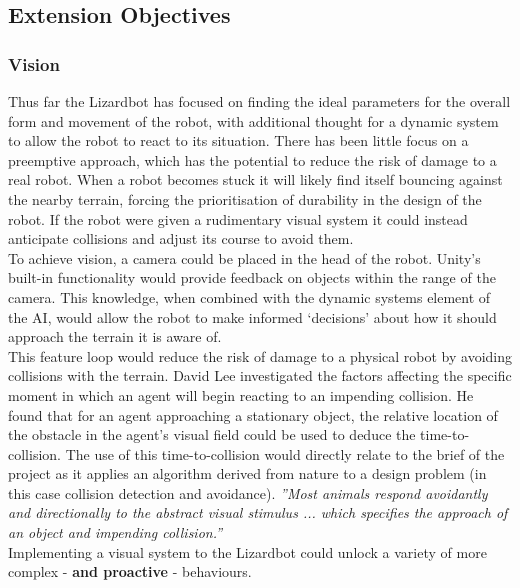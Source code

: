 \documentclass{article}
\begin{document}
\subsection{Extension Objectives}
\label{sec:Extension Objectives}
\subsubsection{Vision}
\label{sec:Vision}
Thus far the Lizardbot has focused on finding the ideal parameters for the overall form and movement of the robot, with additional thought for a dynamic system to allow the robot to react to its situation. There has been little focus on a preemptive approach, which has the potential to reduce the risk of damage to a real robot. When a robot becomes stuck it will likely find itself bouncing against the nearby terrain, forcing the prioritisation of durability in the design of the robot. If the robot were given a rudimentary visual system it could instead anticipate collisions and adjust its course to avoid them.\\
To achieve vision, a camera could be placed in the head of the robot. Unity’s built-in functionality would provide feedback on objects within the range of the camera. This knowledge, when combined with the dynamic systems element of the AI, would allow the robot to make informed ‘decisions’ about how it should approach the terrain it is aware of. \\
This feature loop would reduce the risk of damage to a physical robot by avoiding collisions with the terrain. David Lee investigated the factors affecting the specific moment in which an agent will begin reacting to an impending collision. He found that for an agent approaching a stationary object, the relative location of the obstacle in the agent’s visual field could be used to deduce the time-to-collision.  The use of this time-to-collision would directly relate to the brief of the project as it applies an algorithm derived from nature to a design problem (in this case collision detection and avoidance). \textit{”Most animals respond avoidantly and directionally to the abstract visual stimulus ... which specifies the approach of an object and impending collision.”} \\
Implementing a visual system to the Lizardbot could unlock a variety of more complex - \textbf{and proactive} - behaviours.

\newpage
\end{document}
